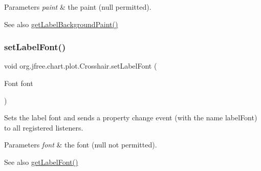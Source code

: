 \begin{DoxyParams}{Parameters}
{\em paint} & the paint ({\ttfamily null} permitted).\\
\hline
\end{DoxyParams}
\begin{DoxySeeAlso}{See also}
\mbox{\hyperlink{classorg_1_1jfree_1_1chart_1_1plot_1_1_crosshair_a26faed5cbc5180e8843d2e9daf7108f0}{get\+Label\+Background\+Paint()}} 
\end{DoxySeeAlso}
\mbox{\label{classorg_1_1jfree_1_1chart_1_1plot_1_1_crosshair_af031c43475ea37a6083b21c732ab90f7}} 
\subsubsection{\texorpdfstring{set\+Label\+Font()}{setLabelFont()}}
{\footnotesize\ttfamily void org.\+jfree.\+chart.\+plot.\+Crosshair.\+set\+Label\+Font (\begin{DoxyParamCaption}\item[{Font}]{font }\end{DoxyParamCaption})}

Sets the label font and sends a property change event (with the name \textquotesingle{}label\+Font\textquotesingle{}) to all registered listeners.


\begin{DoxyParams}{Parameters}
{\em font} & the font ({\ttfamily null} not permitted).\\
\hline
\end{DoxyParams}
\begin{DoxySeeAlso}{See also}
\mbox{\hyperlink{classorg_1_1jfree_1_1chart_1_1plot_1_1_crosshair_afb84271c0859b4aed129081296f9ea32}{get\+Label\+Font()}} 
\end{DoxySeeAlso}
\mbox{\label{classorg_1_1jfree_1_1chart_1_1plot_1_1_crosshair_ac07a28b245af96a81878bb4ad015490c}} 
